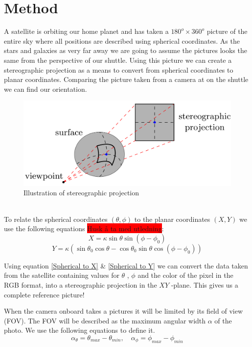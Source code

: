 \documentclass[reprint,english,notitlepage]{revtex4-2}
\begin{document}
\section{Method} \label{sec:method}
A satellite is orbiting our home planet and has taken a $ 180 ^{o} \times 360 ^{o} $ picture of the entire sky where all positions are described using spherical coordinates. As the stars and galaxies as very far away we are going to assume the pictures looks the same from the perspective of our shuttle. Using this picture we can create a stereographic projection as a means to convert from spherical coordinates to planar coordinates. Comparing the picture taken from a camera at on the shuttle we can find our orientation.
\begin{figure}[h!]
  \centering
  \includegraphics[scale = .2]{Figures/Stereographic_projection}
  \caption{Illustration of stereographic projection}
  \label{fig: Stereographic Projection}
\end{figure}\\

To relate the spherical coordinates $ (\theta, \phi) $ to the planar coordinates $ (X, Y) $ we use the following equations \colorbox{red}{Husk å ta med utledning}:
\begin{equation} \label{Spherical to X}
	X = κ  \sin θ \sin (ϕ - ϕ _0)
\end{equation}
\begin{equation}\label{Spherical to Y}
	Y = κ (\sin θ _0 \cos  θ - \cos θ _0 \sin θ \cos (ϕ - ϕ _0))  
\end{equation}

Using equation \ref{Spherical to X} \& \ref{Spherical to Y} we can convert the data taken from the satellite containing values for $ \theta $ , $ \phi  $ and the color of the pixel in the RGB format, into a stereographic projection in the $ XY $ -plane. This gives us a complete reference picture!

When the camera onboard takes a pictures it will be limited by its field of view (FOV). The FOV will be described as the maximum angular width $ \alpha $ of the photo. We use the following equations to define it. 
\begin{equation} \label{eq: max angular width}
	α _{\theta} = θ _{max} - \theta _{min}, \quad α _{\phi} = ϕ _{max} - ϕ _{min}
\end{equation}
\end{document}
